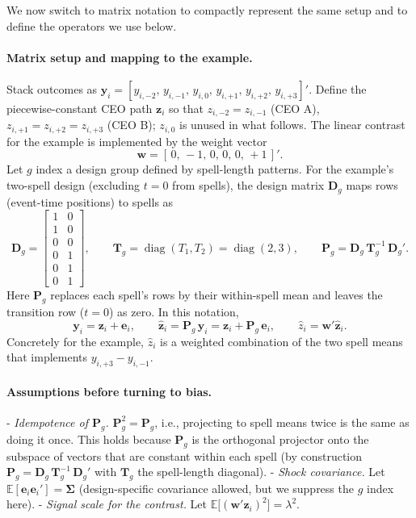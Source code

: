\documentclass[11pt,a4paper]{article}
\begin{document}
We now switch to matrix notation to compactly represent the same setup and to define the operators we use below.

\paragraph{Matrix setup and mapping to the example.} Stack outcomes as $\mathbf y_i=[y_{i,-2},\,y_{i,-1},\,y_{i,0},\,y_{i,+1},\,y_{i,+2},\,y_{i,+3}]'$. Define the piecewise-constant CEO path $\mathbf z_i$ so that $z_{i,-2}=z_{i,-1}$ (CEO A), $z_{i,+1}=z_{i,+2}=z_{i,+3}$ (CEO B); $z_{i,0}$ is unused in what follows. The linear contrast for the example is implemented by the weight vector
\[
  \mathbf w = [\,0,\,-1,\,0,\,0,\,0,\,+1\,]'.
\]
Let $g$ index a design group defined by spell-length patterns. For the example’s two-spell design (excluding $t=0$ from spells), the design matrix $\mathbf D_g$ maps rows (event-time positions) to spells as
\[
  \mathbf D_g = \begin{bmatrix}
    1 & 0\\
    1 & 0\\
    0 & 0\\
    0 & 1\\
    0 & 1\\
    0 & 1
  \end{bmatrix},\qquad
  \mathbf T_g = \operatorname{diag}(T_1,T_2)=\operatorname{diag}(2,3),\qquad
  \mathbf P_g = \mathbf D_g\,\mathbf T_g^{-1}\,\mathbf D_g'.
\]
Here $\mathbf P_g$ replaces each spell’s rows by their within-spell mean and leaves the transition row ($t=0$) as zero. In this notation,
\[
  \mathbf y_i = \mathbf z_i + \mathbf e_i,\qquad \hat{\mathbf z}_i = \mathbf P_g\,\mathbf y_i=\mathbf z_i + \mathbf P_g\,\mathbf e_i,\qquad \hat z_i = \mathbf w'\hat{\mathbf z}_i.
\]
Concretely for the example, $\hat z_i$ is a weighted combination of the two spell means that implements $y_{i,+3}-y_{i,-1}$.

\paragraph{Assumptions before turning to bias.}
- \textit{Idempotence of $\mathbf P_g$.} $\mathbf P_g^2=\mathbf P_g$, i.e., projecting to spell means twice is the same as doing it once. This holds because $\mathbf P_g$ is the orthogonal projector onto the subspace of vectors that are constant within each spell (by construction $\mathbf P_g=\mathbf D_g\,\mathbf T_g^{-1}\,\mathbf D_g'$ with $\mathbf T_g$ the spell-length diagonal).
- \textit{Shock covariance.} Let $\mathbb E[\mathbf e_i\mathbf e_i']=\boldsymbol\Sigma$ (design-specific covariance allowed, but we suppress the $g$ index here).
- \textit{Signal scale for the contrast.} Let $\mathbb E\big[(\mathbf w'\mathbf z_i)^2\big]=\lambda^2$.
\end{document}
